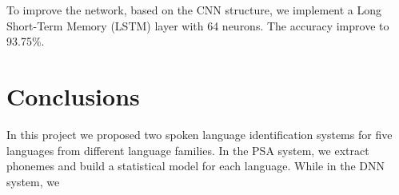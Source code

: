 \documentclass{article}
\begin{document}
To improve the network, based on the CNN structure, we implement a Long Short-Term Memory (LSTM) layer with 64 neurons. 
The accuracy improve to 93.75\%.

\section{Conclusions}
\label{sec:conclusion}

In this project we proposed two spoken language identification systems for five languages from different language families. In the PSA system, we extract phonemes and build a statistical model for each language. While in the DNN system, we 
 




\end{document}
